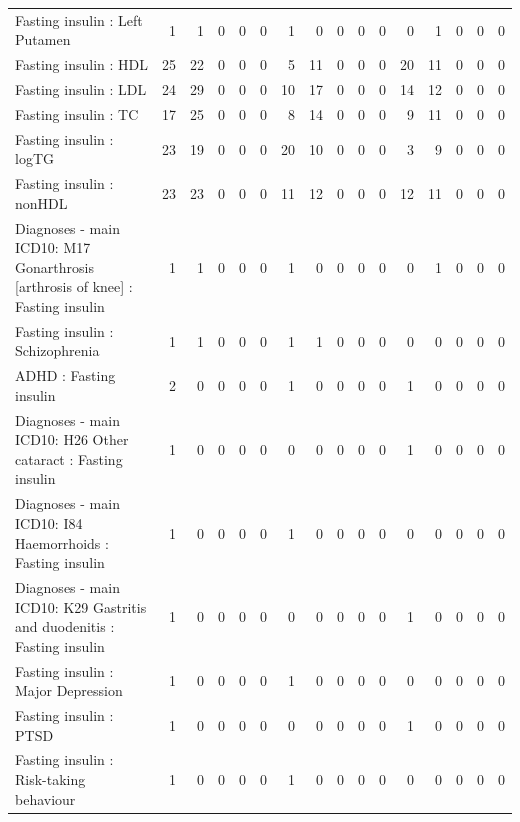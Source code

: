 \begin{table}[ht]
\begin{tabular}{lrrrrrrrrrrrrrrr}
  Fasting insulin : Left Putamen &   1 &   1 &   0 &   0 &   0 &   1 &   0 &   0 &   0 &   0 &   0 &   1 &   0 &   0 &   0 \\ 
  Fasting insulin : HDL &  25 &  22 &   0 &   0 &   0 &   5 &  11 &   0 &   0 &   0 &  20 &  11 &   0 &   0 &   0 \\ 
  Fasting insulin : LDL &  24 &  29 &   0 &   0 &   0 &  10 &  17 &   0 &   0 &   0 &  14 &  12 &   0 &   0 &   0 \\ 
  Fasting insulin : TC &  17 &  25 &   0 &   0 &   0 &   8 &  14 &   0 &   0 &   0 &   9 &  11 &   0 &   0 &   0 \\ 
  Fasting insulin : logTG &  23 &  19 &   0 &   0 &   0 &  20 &  10 &   0 &   0 &   0 &   3 &   9 &   0 &   0 &   0 \\ 
  Fasting insulin : nonHDL &  23 &  23 &   0 &   0 &   0 &  11 &  12 &   0 &   0 &   0 &  12 &  11 &   0 &   0 &   0 \\ 
  Diagnoses - main ICD10: M17 Gonarthrosis [arthrosis of knee] : Fasting insulin &   1 &   1 &   0 &   0 &   0 &   1 &   0 &   0 &   0 &   0 &   0 &   1 &   0 &   0 &   0 \\ 
  Fasting insulin : Schizophrenia &   1 &   1 &   0 &   0 &   0 &   1 &   1 &   0 &   0 &   0 &   0 &   0 &   0 &   0 &   0 \\ 
  ADHD : Fasting insulin &   2 &   0 &   0 &   0 &   0 &   1 &   0 &   0 &   0 &   0 &   1 &   0 &   0 &   0 &   0 \\ 
  Diagnoses - main ICD10: H26 Other cataract : Fasting insulin &   1 &   0 &   0 &   0 &   0 &   0 &   0 &   0 &   0 &   0 &   1 &   0 &   0 &   0 &   0 \\ 
  Diagnoses - main ICD10: I84 Haemorrhoids : Fasting insulin &   1 &   0 &   0 &   0 &   0 &   1 &   0 &   0 &   0 &   0 &   0 &   0 &   0 &   0 &   0 \\ 
  Diagnoses - main ICD10: K29 Gastritis and duodenitis : Fasting insulin &   1 &   0 &   0 &   0 &   0 &   0 &   0 &   0 &   0 &   0 &   1 &   0 &   0 &   0 &   0 \\ 
  Fasting insulin : Major Depression &   1 &   0 &   0 &   0 &   0 &   1 &   0 &   0 &   0 &   0 &   0 &   0 &   0 &   0 &   0 \\ 
  Fasting insulin : PTSD &   1 &   0 &   0 &   0 &   0 &   0 &   0 &   0 &   0 &   0 &   1 &   0 &   0 &   0 &   0 \\ 
  Fasting insulin : Risk-taking behaviour &   1 &   0 &   0 &   0 &   0 &   1 &   0 &   0 &   0 &   0 &   0 &   0 &   0 &   0 &   0 \\ 

\end{tabular}
\end{table}
